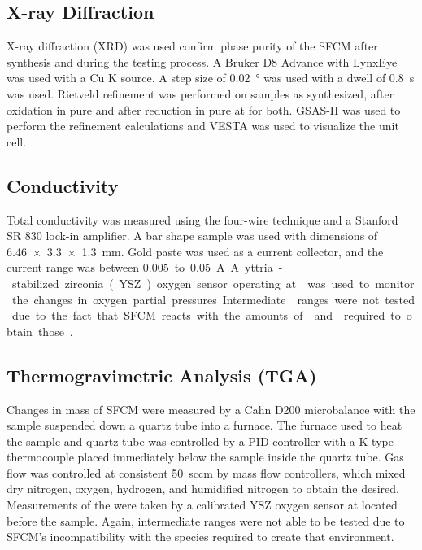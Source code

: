     \subsection{X-ray Diffraction}
        X-ray diffraction (XRD) was used confirm phase purity of the SFCM after synthesis and during the testing process.
        A Bruker D8 Advance with LynxEye was used with a Cu K\textsubscript{\textalpha{}} source.
        A step size of \SI{0.02}{\degree} was used with a dwell of \SI{0.8}{\second} was used.
        Rietveld refinement was performed on samples as synthesized, after oxidation in pure  and after reduction in pure  at  for both.
        GSAS-II was used to perform the refinement calculations and VESTA was used to visualize the unit cell.\cite{Toby2013,Momma2011}

    \subsection{Conductivity}
        Total conductivity was measured using the four-wire technique and a Stanford SR 830 lock-in amplifier.
        A bar shape sample was used with dimensions of \SI{6.46x3.3x1.3}{\milli\meter}.
        Gold paste was used as a current collector, and the current range was between \SI{0.005} to \SI{0.05}{A}.
        A yttria-stabilized zirconia (YSZ) oxygen sensor operating at  was used to monitor the changes in oxygen partial pressures.
        Intermediate  ranges were not tested due to the fact that SFCM reacts with the amounts of  and  required to obtain those .

    \subsection{Thermogravimetric Analysis (TGA)}
        Changes in mass of SFCM were measured by a Cahn D200 microbalance with the sample suspended down a quartz tube into a furnace.
        The furnace used to heat the sample and quartz tube was controlled by a PID controller with a K-type thermocouple placed immediately below the sample inside the quartz tube.
        Gas flow was controlled at consistent \SI{50}{sccm} by mass flow controllers, which mixed dry nitrogen, oxygen, hydrogen, and humidified nitrogen to obtain the  desired.
        Measurements of the  were taken by a calibrated YSZ oxygen sensor at  located before the sample.
        Again, intermediate  ranges were not able to be tested due to SFCM's incompatibility with the species required to create that environment.

